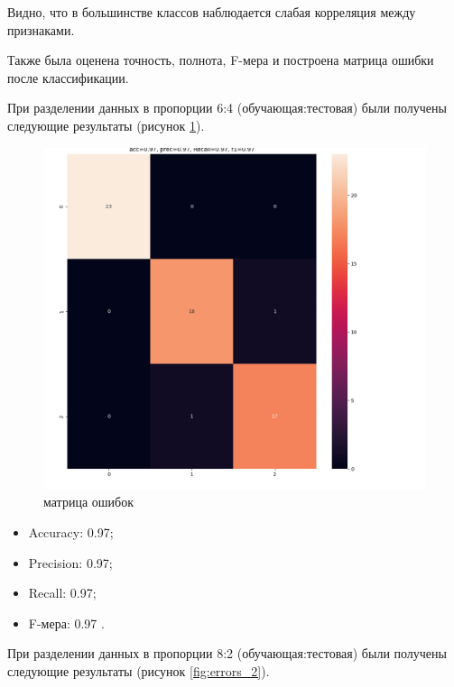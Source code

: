 \documentclass[12pt]{report}
\begin{document}
\newpage
Видно, что в большинстве классов наблюдается слабая корреляция между признаками. 
\newpage

Также была оценена точность, полнота, F-мера и построена матрица ошибки после классификации.

При разделении данных в пропорции 6:4 (обучающая:тестовая) были получены следующие результаты (рисунок \ref{fig:errors}).

\begin{figure}[h!]
  \centering
  \includegraphics[width = \linewidth ]{matrix_errors.png}
  \caption{матрица ошибок}
  \label{fig:errors}
\end{figure}

\begin{itemize}
    \item Accuracy: 0.97;
    \item Precision: 0.97;
    \item Recall: 0.97;
    \item F-мера: 0.97 .
\end{itemize}
\newpage
При разделении данных в пропорции 8:2 (обучающая:тестовая) были получены следующие результаты (рисунок \ref{fig:errors_2}).
\end{document}
